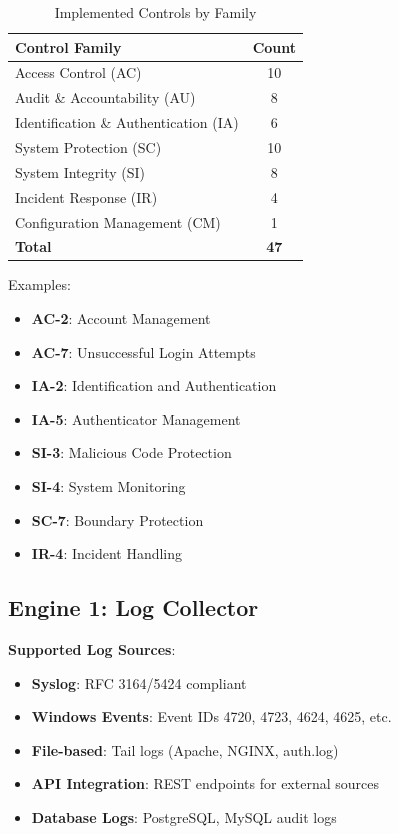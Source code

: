 \documentclass[11pt,conference]{IEEEtran}
\begin{document}
\begin{table}[h]
\centering
\caption{Implemented Controls by Family}
\begin{tabular}{|l|c|}
\hline
\textbf{Control Family} & \textbf{Count} \\
\hline
Access Control (AC) & 10 \\
\hline
Audit \& Accountability (AU) & 8 \\
\hline
Identification \& Authentication (IA) & 6 \\
\hline
System Protection (SC) & 10 \\
\hline
System Integrity (SI) & 8 \\
\hline
Incident Response (IR) & 4 \\
\hline
Configuration Management (CM) & 1 \\
\hline
\textbf{Total} & \textbf{47} \\
\hline
\end{tabular}
\end{table}

Examples:
\begin{itemize}
    \item \textbf{AC-2}: Account Management
    \item \textbf{AC-7}: Unsuccessful Login Attempts
    \item \textbf{IA-2}: Identification and Authentication
    \item \textbf{IA-5}: Authenticator Management
    \item \textbf{SI-3}: Malicious Code Protection
    \item \textbf{SI-4}: System Monitoring
    \item \textbf{SC-7}: Boundary Protection
    \item \textbf{IR-4}: Incident Handling
\end{itemize}

\subsection{Engine 1: Log Collector}

\textbf{Supported Log Sources}:
\begin{itemize}
    \item \textbf{Syslog}: RFC 3164/5424 compliant
    \item \textbf{Windows Events}: Event IDs 4720, 4723, 4624, 4625, etc.
    \item \textbf{File-based}: Tail logs (Apache, NGINX, auth.log)
    \item \textbf{API Integration}: REST endpoints for external sources
    \item \textbf{Database Logs}: PostgreSQL, MySQL audit logs
\end{itemize}
\end{document}
